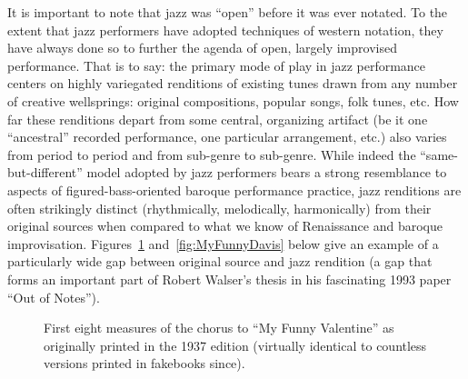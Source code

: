     It is important to note that jazz was ``open'' before it was ever notated. To the extent that jazz performers have adopted techniques of western notation, they have always done so to further the agenda of open, largely improvised performance. That is to say: the primary mode of play in jazz performance centers on highly variegated renditions of existing tunes drawn from any number of creative wellsprings: original compositions, popular songs, folk tunes, etc. How far these renditions depart from some central, organizing artifact (be it one ``ancestral'' recorded performance, one particular arrangement, etc.) also varies from period to period and from sub-genre to sub-genre. While indeed the ``same-but-different'' model adopted by jazz performers bears a strong resemblance to aspects of figured-bass-oriented baroque performance practice, jazz renditions are often strikingly distinct (rhythmically, melodically, harmonically) from their original sources when compared to what we know of Renaissance and baroque improvisation. Figures~\ref{fig:MyFunnyOrig} and~\ref{fig:MyFunnyDavis} below give an example of a particularly wide gap between original source and jazz rendition (a gap that forms an important part of Robert Walser's thesis in his fascinating 1993 paper ``Out of Notes'').

        \begin{figure}
            \centering
            \captionsetup{width=.5\textwidth}
            \caption[First eight measures of the chorus to ``My Funny Valentine'' as originally printed in the 1937 edition (virtually identical to countless versions printed in fakebooks since).]{First eight measures of the chorus to ``My Funny Valentine'' as originally printed in the 1937 edition (virtually identical to countless versions printed in fakebooks since).}
            \label{fig:MyFunnyOrig}
        \end{figure}


